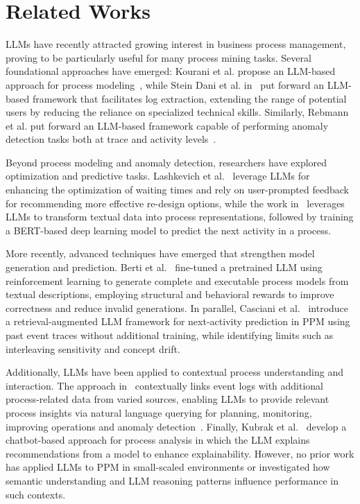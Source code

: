 \documentclass[manuscript,screen,review]{acmart}
\begin{document}
\section{Related Works}\label{sec:rw}

LLMs have recently attracted growing interest in business process management, proving to be particularly useful for many process mining tasks. Several foundational approaches have emerged: Kourani et al. propose an LLM-based approach for process modeling~\cite{10.1007/978-3-031-61007-3_18}, while Stein Dani et al. in~\cite{DBLP:conf/coopis/DaniDLBBWR24} put forward an LLM-based framework that facilitates log extraction, extending the range of potential users by reducing the reliance on specialized technical skills. Similarly, Rebmann et al. put forward an LLM-based framework capable of performing anomaly detection tasks both at trace and activity levels~\cite{DBLP:conf/icpm/RebmannSGA24}.

Beyond process modeling and anomaly detection, researchers have explored optimization and predictive tasks. Lashkevich et al.~\cite{DBLP:conf/bpm/LashkevichMAD24} leverage LLMs for enhancing the optimization of waiting times and rely on user-prompted feedback for recommending more effective re-design options, while the work in~\cite{10680620} leverages LLMs to transform textual data into process representations, followed by training a BERT-based deep learning model to predict the next activity in a process.

More recently, advanced techniques have emerged that strengthen model generation and prediction. Berti et al.~\cite{Berti2025} fine-tuned a pretrained LLM using reinforcement learning to generate complete and executable process models from textual descriptions, employing structural and behavioral rewards to improve correctness and reduce invalid generations. In parallel, Casciani et al.~\cite{CASCIANI2026102642} introduce a retrieval-augmented LLM framework for next-activity prediction in PPM using past event traces without additional training, while identifying limits such as interleaving sensitivity and concept drift.

Additionally, LLMs have been applied to contextual process understanding and interaction. The approach in~\cite{10899487} contextually links event logs with additional process-related data from varied sources, enabling LLMs to provide relevant process insights via natural language querying for planning, monitoring, improving operations and anomaly detection~\cite{10.1007/978-3-032-02867-9_19}. Finally, Kubrak et al.~\cite{DBLP:conf/bpm/KubrakBMND24} develop a chatbot-based approach for process analysis in which the LLM explains recommendations from a model to enhance explainability. However, no prior work has applied LLMs to PPM in small-scaled environments or investigated how semantic understanding and LLM reasoning patterns influence performance in such contexts.
\end{document}
